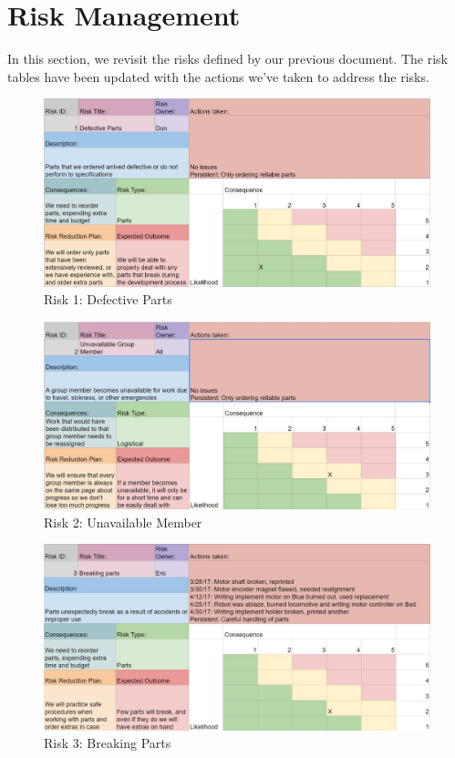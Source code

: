 
\section{Risk Management}
\label{sec:risk_management}

In this section, we revisit the risks defined by our previous document. The risk tables have been updated with the actions we've taken to address the risks.\

\begin{figure}[h!]
\centering
\includegraphics[width=0.98\columnwidth]{risks/risk1.JPG}
\caption{Risk 1: Defective Parts}
\label{fig:risk1}
\end{figure}

\begin{figure}[h!]
\centering
\includegraphics[width=0.98\columnwidth]{risks/risk2.JPG}
\caption{Risk 2: Unavailable Member}
\label{fig:risk2}
\end{figure}

\begin{figure}[h!]
\centering
\includegraphics[width=0.98\columnwidth]{risks/risk3.JPG}
\caption{Risk 3: Breaking Parts}
\label{fig:risk3}
\end{figure}

